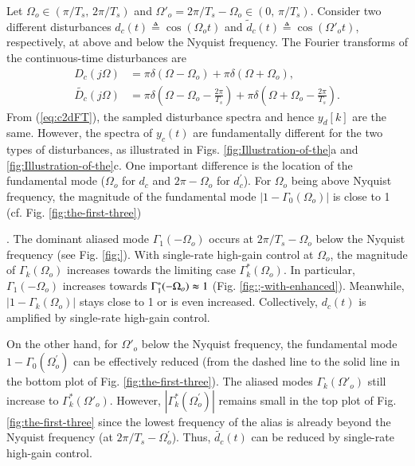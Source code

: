 \documentclass [11pt, proquest] {uwthesis}[2020/02/24]
\begin{document}
Let $\Omega_{o}\in(\pi/T_{s},\,2\pi/T_{s})$ and $\Omega'_{o}=2\pi/T_{s}-\Omega_{o}\in(0,\,\pi/T_{s})$.
Consider two different disturbances $d_{c}(t)\triangleq\cos(\Omega_{o}t)$
and $\tilde{d}_{c}(t)\triangleq\cos(\Omega'_{o}t)$, respectively,
at above and below the Nyquist frequency. The Fourier transforms of
the continuous-time disturbances are
\begin{align*}
D_{c}(j\Omega) & =\pi\delta(\Omega-\Omega_{o})+\pi\delta(\Omega+\Omega_{o}),\\
\tilde{D_{c}}(j\Omega) & =\pi\delta(\Omega-\Omega_{o}-\frac{2\pi}{T_{s}})+\pi\delta(\Omega+\Omega_{o}-\frac{2\pi}{T_{s}}).
\end{align*}
From (\ref{eq:c2dFT}), the sampled disturbance spectra and hence
$y_{d}[k]$ are the same. However, the spectra of $y_{c}(t)$ are
fundamentally different for the two types of disturbances, as illustrated
in Figs. \ref{fig:Illustration-of-the}a and \ref{fig:Illustration-of-the}c.
One important difference is the location of the fundamental mode ($\Omega_{o}$
for $d_{c}$ and $2\pi-\Omega_{o}$ for $d_{c}^{'}$). For $\Omega_{o}$
being above Nyquist frequency, the magnitude of the fundamental mode
$\left|1-\Gamma_{0}(\Omega_{o})\right|$ is close to 1 (cf. Fig. \ref{fig:the-first-three})%

. The dominant aliased mode $\Gamma_{1}(-\Omega_{o})$ occurs at $2\pi/T_{s}-\Omega_{o}$
below the Nyquist frequency (see Fig. \ref{fig:}). With single-rate
high-gain control at $\Omega_{o}$, the magnitude of $\Gamma_{k}(\Omega_{o})$
increases towards the limiting case $\Gamma_{k}^{*}(\Omega_{o})$.
In particular, $\Gamma_{1}(-\Omega_{o})$ increases towards $\Gamma_{1}^{*}(-\Omega_{o})\thickapprox1$
(Fig. \ref{fig:;-with-enhanced}). Meanwhile, $|1-\Gamma_{k}(\Omega_{o})|$
stays close to 1 or is even increased. Collectively, $d_{c}(t)$ is
amplified by single-rate high-gain control.

On the other hand, for $\Omega'_{o}$ below the Nyquist frequency,
the fundamental mode $1-\Gamma_{0}(\Omega_{o}^{'})$ can be effectively
reduced (from the dashed line to the solid line in the bottom plot
of Fig. \ref{fig:the-first-three}). The aliased modes $\Gamma_{k}(\Omega'_{o})$
still increase to $\Gamma_{k}^{*}(\Omega'_{o})$. However, $|\Gamma_{k}^{*}(\Omega_{o}^{'})|$
remains small in the top plot of Fig. \ref{fig:the-first-three} since
the lowest frequency of the alias is already beyond the Nyquist frequency
(at $2\pi/T_{s}-\Omega_{o}^{'}$). Thus, $\tilde{d_{c}}(t)$ can be
reduced by single-rate high-gain control.
\end{document}
